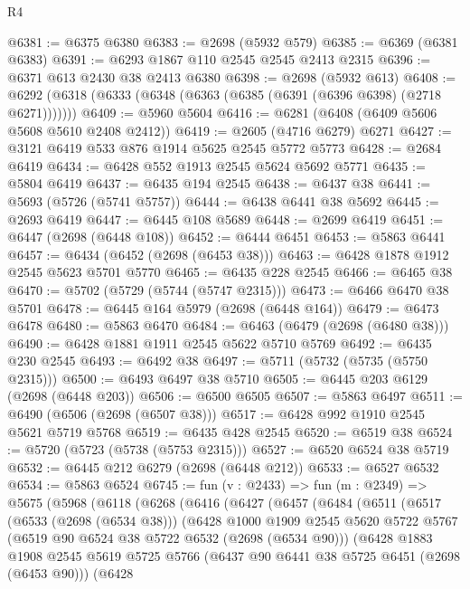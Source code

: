 \begin{lexlean}{R4}
\begin{coremodule}
@6381 := @6375 @6380
@6383 := @2698 (@5932 @579)
@6385 := @6369 (@6381 @6383)
@6391 := @6293 @1867 @110 @2545 @2545 @2413 @2315
@6396 := @6371 @613 @2430 @38 @2413 @6380
@6398 := @2698 (@5932 @613)
@6408 := @6292 (@6318 (@6333 (@6348 (@6363 (@6385 (@6391 (@6396 @6398) (@2718 @6271)))))))
@6409 := @5960 @5604
@6416 := @6281 (@6408 (@6409 @5606 @5608 @5610 @2408 @2412))
@6419 := @2605 (@4716 @6279) @6271
@6427 := @3121 @6419 @533 @876 @1914 @5625 @2545 @5772 @5773
@6428 := @2684 @6419
@6434 := @6428 @552 @1913 @2545 @5624 @5692 @5771
@6435 := @5804 @6419
@6437 := @6435 @194 @2545
@6438 := @6437 @38
@6441 := @5693 (@5726 (@5741 @5757))
@6444 := @6438 @6441 @38 @5692
@6445 := @2693 @6419
@6447 := @6445 @108 @5689
@6448 := @2699 @6419
@6451 := @6447 (@2698 (@6448 @108))
@6452 := @6444 @6451
@6453 := @5863 @6441
@6457 := @6434 (@6452 (@2698 (@6453 @38)))
@6463 := @6428 @1878 @1912 @2545 @5623 @5701 @5770
@6465 := @6435 @228 @2545
@6466 := @6465 @38
@6470 := @5702 (@5729 (@5744 (@5747 @2315)))
@6473 := @6466 @6470 @38 @5701
@6478 := @6445 @164 @5979 (@2698 (@6448 @164))
@6479 := @6473 @6478
@6480 := @5863 @6470
@6484 := @6463 (@6479 (@2698 (@6480 @38)))
@6490 := @6428 @1881 @1911 @2545 @5622 @5710 @5769
@6492 := @6435 @230 @2545
@6493 := @6492 @38
@6497 := @5711 (@5732 (@5735 (@5750 @2315)))
@6500 := @6493 @6497 @38 @5710
@6505 := @6445 @203 @6129 (@2698 (@6448 @203))
@6506 := @6500 @6505
@6507 := @5863 @6497
@6511 := @6490 (@6506 (@2698 (@6507 @38)))
@6517 := @6428 @992 @1910 @2545 @5621 @5719 @5768
@6519 := @6435 @428 @2545
@6520 := @6519 @38
@6524 := @5720 (@5723 (@5738 (@5753 @2315)))
@6527 := @6520 @6524 @38 @5719
@6532 := @6445 @212 @6279 (@2698 (@6448 @212))
@6533 := @6527 @6532
@6534 := @5863 @6524
@6745 := fun (v : @2433) =>
  fun (m : @2349) =>
  @5675
    (@5968
      (@6118
        (@6268
          (@6416
            (@6427
              (@6457
                (@6484
                  (@6511
                    (@6517
                      (@6533 (@2698 (@6534 @38)))
                      (@6428
                        @1000
                        @1909
                        @2545
                        @5620
                        @5722
                        @5767
                        (@6519 @90 @6524 @38 @5722 @6532 (@2698 (@6534 @90)))
                        (@6428
                          @1883
                          @1908
                          @2545
                          @5619
                          @5725
                          @5766
                          (@6437 @90 @6441 @38 @5725 @6451 (@2698 (@6453 @90)))
                          (@6428

\end{coremodule}
\end{lexlean}
